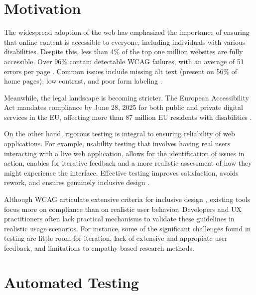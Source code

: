 
\section{Motivation}

The widespread adoption of the web has emphasized the importance of ensuring that online content is accessible to everyone, including individuals with various disabilities\cite{abu2023web}. Despite this, less than 4\% of the top one million websites are fully accessible. Over 96\% contain detectable \ac{WCAG} failures, with an average of 51 errors per page \cite{webaimmillion2025}. Common issues include missing alt text (present on 56\% of home pages), low contrast, and poor form labeling \cite{audioeye2024}.

Meanwhile, the legal landscape is becoming stricter. The European Accessibility Act mandates compliance by June 28, 2025 for both public and private digital services in the EU, affecting more than 87 million EU residents with disabilities \cite{audioeyeEAA2025, accessibleEU2025}. %

On the other hand, rigorous testing is integral to ensuring reliability of web applications. For example, usability testing that involves having real users interacting with a live web application, allows for the identification of issues in action, enables for iterative feedback and a more realistic assessment of how they might experience the interface. Effective testing improves satisfaction, avoids rework, and ensures genuinely inclusive design \cite{accessdesign2025}.

Although \ac{WCAG} articulate extensive criteria for inclusive design \cite{w3c_WCAG22}, existing tools focus more on compliance than on realistic user behavior. Developers and UX practitioners often lack practical mechanisms to validate these guidelines in realistic usage scenarios. For instance, some of the significant challenges found in testing are little room for iteration, lack of extensive and appropiate user feedback, and limitations to empathy-based research methods\cite{lu2025uxagent}.


\section{Automated Testing}

